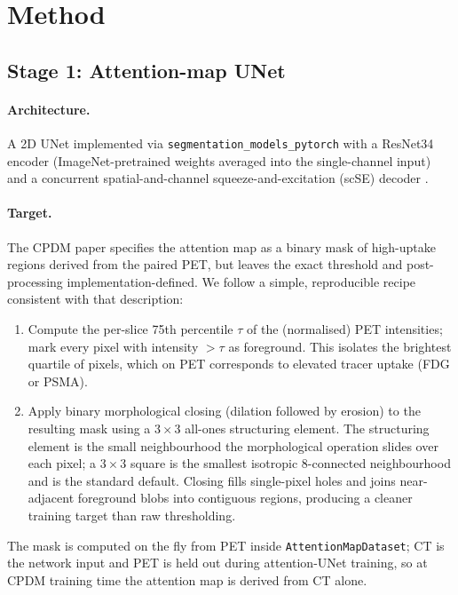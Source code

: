 \documentclass[11pt,a4paper]{article}
\begin{document}
\section{Method}

\subsection{Stage 1: Attention-map UNet}

\paragraph{Architecture.} A 2D UNet \parencite{ronneberger2015unet} implemented via \texttt{segmentation\_models\_pytorch} \parencite{iakubovskii2019smp} with a ResNet34 \parencite{he2016resnet} encoder (ImageNet-pretrained weights averaged into the single-channel input) and a concurrent spatial-and-channel squeeze-and-excitation (scSE) decoder \parencite{roy2018scse}.

\paragraph{Target.} The CPDM paper specifies the attention map as a binary mask of high-uptake regions derived from the paired PET, but leaves the exact threshold and post-processing implementation-defined. We follow a simple, reproducible recipe consistent with that description:
\begin{enumerate}
  \item Compute the per-slice 75th percentile $\tau$ of the (normalised) PET intensities; mark every pixel with intensity $> \tau$ as foreground. This isolates the brightest quartile of pixels, which on PET corresponds to elevated tracer uptake (FDG or PSMA).
  \item Apply binary morphological closing (dilation followed by erosion) to the resulting mask using a $3 \times 3$ all-ones structuring element. The structuring element is the small neighbourhood the morphological operation slides over each pixel; a $3 \times 3$ square is the smallest isotropic 8-connected neighbourhood and is the standard default. Closing fills single-pixel holes and joins near-adjacent foreground blobs into contiguous regions, producing a cleaner training target than raw thresholding.
\end{enumerate}
The mask is computed on the fly from PET inside \texttt{AttentionMapDataset}; CT is the network input and PET is held out during attention-UNet training, so at CPDM training time the attention map is derived from CT alone.
\end{document}
